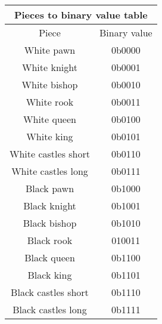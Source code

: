 \documentclass{article}
\begin{document}
\begin{center}
\begin{tabular}{ |c|c| }
 \hline
 \multicolumn{2}{|c|}{Pieces to binary value table} \\
 \hline
 Piece & Binary value \\
 \hline
 White pawn & 0b0000 \\
 \hline
 White knight & 0b0001 \\
 \hline
 White bishop & 0b0010 \\
 \hline
 White rook & 0b0011 \\
 \hline
 White queen & 0b0100 \\
 \hline
 White king & 0b0101 \\
 \hline
 White castles short & 0b0110 \\
 \hline
 White castles long & 0b0111 \\
 \hline
 Black pawn & 0b1000 \\
 \hline
 Black knight & 0b1001 \\
 \hline
 Black bishop & 0b1010 \\
 \hline
 Black rook & 010011 \\
 \hline
 Black queen & 0b1100 \\
 \hline
 Black king & 0b1101 \\
 \hline
 Black castles short & 0b1110 \\
 \hline
 Black castles long & 0b1111 \\
 \hline
\end{tabular}
\end{center}
\end{document}
